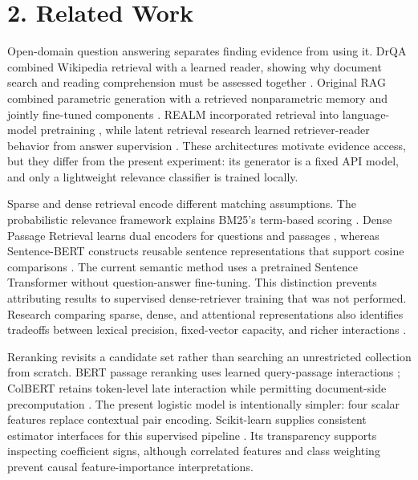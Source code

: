 \documentclass[
  11pt,
]{article}
\begin{document}
\hypertarget{related-work}{%
\section{2. Related Work}\label{related-work}}

Open-domain question answering separates finding evidence from using it.
DrQA combined Wikipedia retrieval with a learned reader, showing why
document search and reading comprehension must be assessed together
\citep{drqa}. Original RAG combined parametric generation with a
retrieved nonparametric memory and jointly fine-tuned components
\citep{rag}. REALM incorporated retrieval into language-model
pretraining \citep{realm}, while latent retrieval research learned
retriever-reader behavior from answer supervision \citep{orqa}. These
architectures motivate evidence access, but they differ from the present
experiment: its generator is a fixed API model, and only a lightweight
relevance classifier is trained locally.

Sparse and dense retrieval encode different matching assumptions. The
probabilistic relevance framework explains BM25's term-based scoring
\citep{bm25}. Dense Passage Retrieval learns dual encoders for questions
and passages \citep{dpr}, whereas Sentence-BERT constructs reusable
sentence representations that support cosine comparisons \citep{sbert}.
The current semantic method uses a pretrained Sentence Transformer
without question-answer fine-tuning. This distinction prevents
attributing results to supervised dense-retriever training that was not
performed. Research comparing sparse, dense, and attentional
representations also identifies tradeoffs between lexical precision,
fixed-vector capacity, and richer interactions \citep{luan}.

Reranking revisits a candidate set rather than searching an unrestricted
collection from scratch. BERT passage reranking uses learned
query-passage interactions \citep{bert_rerank}; ColBERT retains
token-level late interaction while permitting document-side
precomputation \citep{colbert}. The present logistic model is
intentionally simpler: four scalar features replace contextual pair
encoding. Scikit-learn supplies consistent estimator interfaces for this
supervised pipeline \citep{sklearn_paper}. Its transparency supports
inspecting coefficient signs, although correlated features and class
weighting prevent causal feature-importance interpretations.
\end{document}
